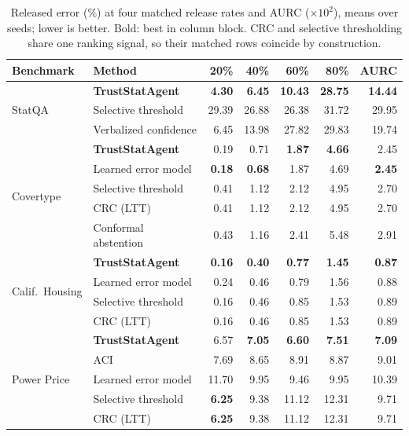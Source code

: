 \documentclass[preprint,12pt,authoryear]{elsarticle}
\begin{document}
\begin{table}[t]
    \centering
    \caption{Released error (\%) at four matched release rates and AURC ($\times 10^{2}$), means over seeds; lower is better. Bold: best in column block. CRC and selective thresholding share one ranking signal, so their matched rows coincide by construction.}
    \label{tab:matched_release}
    \scriptsize
    \setlength{\tabcolsep}{4pt}
    \renewcommand{\arraystretch}{1.12}
    \begin{tabular}{@{}llrrrrr@{}}
        \toprule
        \textbf{Benchmark} & \textbf{Method} & \textbf{20\%} & \textbf{40\%} & \textbf{60\%} & \textbf{80\%} & \textbf{AURC} \\
        \midrule
        \multirow{3}{*}{StatQA}
        & \textbf{TrustStatAgent} & \textbf{4.30} & \textbf{6.45} & \textbf{10.43} & \textbf{28.75} & \textbf{14.44} \\
        & Selective threshold     & 29.39 & 26.88 & 26.38 & 31.72 & 29.95 \\
        & Verbalized confidence   & 6.45  & 13.98 & 27.82 & 29.83 & 19.74 \\
        \midrule
        \multirow{5}{*}{Covertype}
        & \textbf{TrustStatAgent} & 0.19 & 0.71 & \textbf{1.87} & \textbf{4.66} & 2.45 \\
        & Learned error model     & \textbf{0.18} & \textbf{0.68} & 1.87 & 4.69 & \textbf{2.45} \\
        & Selective threshold     & 0.41 & 1.12 & 2.12 & 4.95 & 2.70 \\
        & CRC (LTT)               & 0.41 & 1.12 & 2.12 & 4.95 & 2.70 \\
        & Conformal abstention    & 0.43 & 1.16 & 2.41 & 5.48 & 2.91 \\
        \midrule
        \multirow{4}{*}{Calif.\ Housing}
        & \textbf{TrustStatAgent} & \textbf{0.16} & \textbf{0.40} & \textbf{0.77} & \textbf{1.45} & \textbf{0.87} \\
        & Learned error model     & 0.24 & 0.46 & 0.79 & 1.56 & 0.88 \\
        & Selective threshold     & 0.16 & 0.46 & 0.85 & 1.53 & 0.89 \\
        & CRC (LTT)               & 0.16 & 0.46 & 0.85 & 1.53 & 0.89 \\
        \midrule
        \multirow{5}{*}{Power Price}
        & \textbf{TrustStatAgent} & 6.57  & \textbf{7.05} & \textbf{6.60} & \textbf{7.51} & \textbf{7.09} \\
        & ACI                     & 7.69  & 8.65  & 8.91  & 8.87  & 9.01  \\
        & Learned error model     & 11.70 & 9.95  & 9.46  & 9.95  & 10.39 \\
        & Selective threshold     & \textbf{6.25} & 9.38 & 11.12 & 12.31 & 9.71 \\
        & CRC (LTT)               & \textbf{6.25} & 9.38 & 11.12 & 12.31 & 9.71 \\
        \bottomrule
    \end{tabular}
\end{table}
\end{document}
